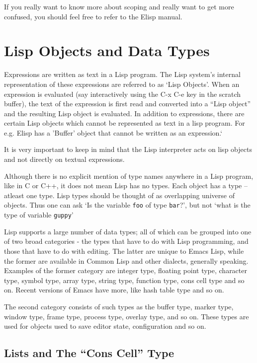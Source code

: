 \documentclass[10pt]{article}
\begin{document}
If you really want to know more about scoping and really want to get more
confused, you should feel free to refer to the Elisp manual.

\section{Lisp Objects and Data Types}

Expressions are written as text in a Lisp program.  The Lisp system's internal
representation of these expressions are referred to as `Lisp Objects'.  When an
expression is evaluated (say interactively using the C-x C-e key in the
\*scratch\* buffer), the text of the expression is first read and converted
into a ``Lisp object'' and the resulting Lisp object is evaluated.  In addition
to expressions, there are certain Lisp objects which cannot be represented as
text in a lisp program.  For e.g.  Elisp has a 'Buffer' object that cannot be
written as an expression.`

It is very important to keep in mind that the Lisp interpreter acts on lisp
objects and not directly on textual expressions.

Although there is no explicit mention of type names anywhere in a Lisp program,
like in C or C++, it does not mean Lisp has no types.  Each object has a type
-- atleast one type.  Lisp types should be thought of as overlapping universe
of objects.  Thus one can ask `Is the variable \texttt{foo} of type
\texttt{bar}?', but not `what is the type of variable \texttt{guppy}'

Lisp supports a large number of data types; all of which can be grouped into
one of two broad categories - the types that have to do with Lisp programming,
and those that have to do with editing.  The latter are unique to Emacs Lisp,
while the former are available in Common Lisp and other dialects, generally
speaking.  Examples of the former category are integer type, floating point
type, character type, symbol type, array type, string type, function type, cons
cell type and so on.  Recent versions of Emacs have more, like hash table type
and so on.

The second category consists of such types as the buffer type, marker type,
window type, frame type, process type, overlay type, and so on.  These types
are used for objects used to save editor state, configuration and so on.

\subsection{Lists and The ``Cons Cell'' Type}
\end{document}
